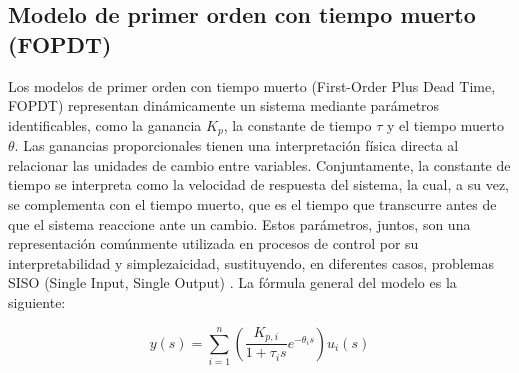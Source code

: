 \subsection{Modelo de primer orden con tiempo muerto (FOPDT)}

Los modelos de primer orden con tiempo muerto (First-Order Plus Dead Time, FOPDT) representan dinámicamente un sistema mediante parámetros identificables, como la ganancia $K_p$, la constante de tiempo $\tau$ y el tiempo muerto $\theta$. Las ganancias proporcionales tienen una interpretación física directa al relacionar las unidades de cambio entre variables. Conjuntamente, la constante de tiempo se interpreta como la velocidad de respuesta del sistema, la cual, a su vez, se complementa con el tiempo muerto, que es el tiempo que transcurre antes de que el sistema reaccione ante un cambio. Estos parámetros, juntos, son una representación comúnmente utilizada en procesos de control por su interpretabilidad y simplezaicidad, sustituyendo, en diferentes casos, problemas SISO (Single Input, Single Output) \cite{ref16}. La fórmula general del modelo es la siguiente:

\begin{equation}
y(s) =
\sum_{i=1}^{n}
\left(
\frac{K_{p,i}}{1 + \tau_i s}
e^{-\theta_i s}
\right)
u_i(s)
\label{eq:fopdt}
\end{equation}

